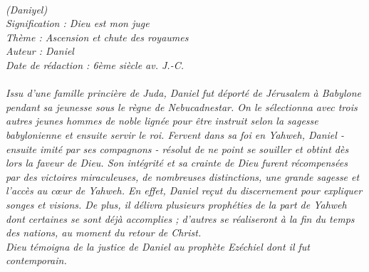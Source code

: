 \BFont
\noindent\hrulefill
{\footnotesize
\textit{
\bigskip
{\centering{}
\\(Daniyel)
\\Signification : Dieu est mon juge
\\Thème : Ascension et chute des royaumes
\\Auteur : Daniel
\\Date de rédaction : 6ème siècle av. J.-C.\\}
}
\textit{
\\Issu d’une famille princière de Juda, Daniel fut déporté de Jérusalem à Babylone pendant sa jeunesse sous le règne de Nebucadnestar. On le sélectionna avec trois autres jeunes hommes de noble lignée pour être instruit selon la sagesse babylonienne et ensuite servir le roi. Fervent dans sa foi en Yahweh, Daniel - ensuite imité par ses compagnons - résolut de ne point se souiller et obtint dès lors la faveur de Dieu. Son intégrité et sa crainte de Dieu furent récompensées par des victoires miraculeuses, de nombreuses distinctions, une grande sagesse et l’accès au cœur de Yahweh. En effet, Daniel reçut du discernement pour expliquer songes et visions. De plus, il délivra plusieurs prophéties de la part de Yahweh dont certaines se sont déjà accomplies ; d’autres se réaliseront à la fin du temps des nations, au moment du retour de Christ.
\\Dieu témoigna de la justice de Daniel au prophète Ezéchiel dont il fut contemporain.\bigskip
}
}
\par\nobreak\noindent\hrulefill
